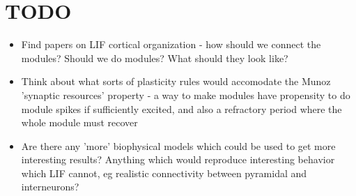 \documentclass[a4paper, 12pt]{article}
\begin{document}
\section*{TODO}
\begin{itemize}
\item Find papers on LIF cortical organization - how should we connect the modules? Should we do modules? What should they look like?
\item Think about what sorts of plasticity rules would accomodate the Munoz 'synaptic resources' property - a way to make modules have propensity to do module spikes if sufficiently excited, and also a refractory period where the whole module must recover
\item Are there any 'more' biophysical models which could be used to get more interesting results? Anything which would reproduce interesting behavior which LIF cannot, eg realistic connectivity between pyramidal and interneurons?
\end{itemize}
\end{document}
